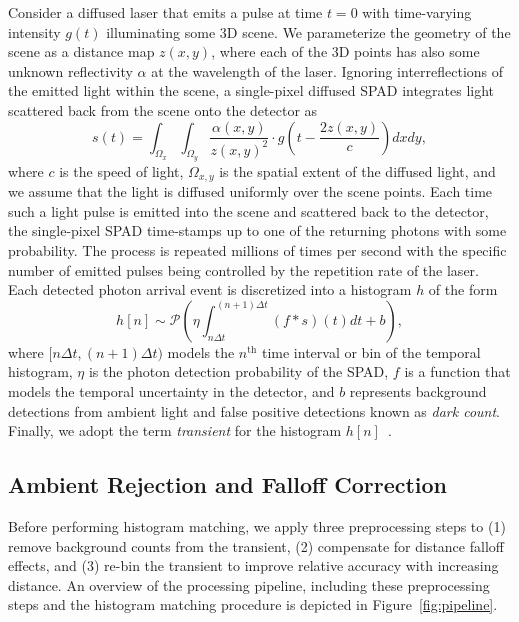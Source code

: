 Consider a diffused laser that emits a pulse at time $t = 0$ with time-varying
intensity $g(t)$ illuminating some 3D scene. We parameterize the geometry of the
scene as a distance map $z(x, y)$, where each of the 3D points has also some
unknown reflectivity $\alpha$ at the wavelength of the laser. Ignoring
interreflections of the emitted light within the scene, a single-pixel diffused
SPAD integrates light scattered back from the scene onto the detector as
%
\begin{equation}
	s \left( t \right)= \int_{\Omega_x} \int_{\Omega_y} \frac{\alpha \left( x,y \right)}{z(x,y)^2} \cdot  g \left( t - \frac{2z(x,y)}{c} \right) dx dy ,
	\label{eq:pulse_integral} 
\end{equation}  
%
where $c$ is the speed of light, $\Omega_{x,y}$ is the spatial extent of the
diffused light, and we assume that the light is diffused uniformly over the
scene points. Each time such a light pulse is emitted into the scene and
scattered back to the detector, the single-pixel SPAD time-stamps up to one of
the returning photons with some probability. The process is repeated millions of
times per second with the specific number of emitted pulses being controlled by
the repetition rate of the laser.  Each detected photon arrival event is
discretized into a histogram $h$ of the form
%
\begin{equation}
  h[n] \sim \mathcal{P} \left( \eta \int_{n\Delta t}^{(n+1)\Delta t} \left(f * s \right) \left( t \right)  dt + b \right),	
	\label{eq:spad_measurements}
\end{equation}
%
where $[n\Delta t, (n+1) \Delta t)$ models the $n^\text{th}$ time interval or bin of the
temporal histogram, $\eta$ is the photon detection probability of the SPAD, $f$
is a function that models the temporal uncertainty in the detector, and $b$
represents background detections from ambient light and false positive detections known as \textit{dark
count}.  Finally, we adopt the term
\textit{transient} for the histogram $h[n]$~\cite{Xin2019}.


\subsection{Ambient Rejection and Falloff Correction} Before performing
histogram matching, we apply three preprocessing steps to (1)
remove background counts from the transient, (2) compensate for distance
falloff effects, and (3) re-bin the transient to improve relative accuracy
with increasing distance. An overview of the processing pipeline, including
these preprocessing steps and the histogram matching procedure is depicted in
Figure~\ref{fig:pipeline}.

